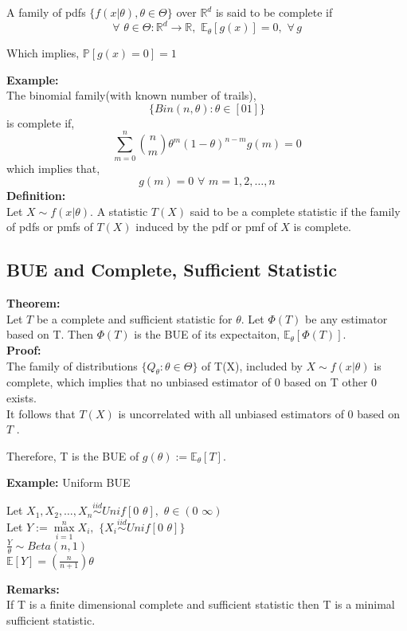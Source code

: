 \documentclass[12pt,a4paper]{article}
\begin{document}
A family of pdfs $\{f(x|\theta),\theta \in \Theta \}$ over $\mathbb{R}^d$ is said to be complete if
$$\forall\,\, \theta\in \Theta : \mathbb{R}^d\rightarrow \mathbb{R}, \,\, \mathbb{E}_\theta[g(x)]=0, \,\, \forall\, g$$
\begin{center}
Which implies,  $\mathbb{P}[g(x)=0]=1$ 
\end{center} 
\textbf{Example:}\\
The binomial family(with known number of trails),
$$\{Bin(n,\theta): \theta\in[0 1]\}$$ is complete if, $$\sum \limits_{m=0}^n {n \choose m}\theta^m(1-\theta)^{n-m} g(m)=0 $$
which implies that, $$g(m)=0\,\, \forall \,\, m=1,2,\dots,n$$
\textbf{Definition:}\\
Let $X \sim f(x|\theta)$. A statistic $T(X)$ said to be a complete statistic if the family of pdfs or pmfs of $T(X)$ induced by the pdf or pmf of $X$ is complete. \\
\subsection{BUE and Complete, Sufficient Statistic}
\textbf{Theorem:}\\
Let $T$ be a complete and sufficient statistic for $\theta.$ Let $\Phi(T)$ be any estimator based on T. Then $\Phi(T)$ is the BUE of its expectaiton, $\mathbb{E}_\theta[\Phi(T)].$\\
\textbf{Proof:}\\
The family of distributions $ \{ Q_ \theta: \theta \in \Theta \}$ of T(X), included by $X \sim f(x| \theta)$ is complete, which implies that no unbiased estimator of 0 based on T other 0 exists.\\
It follows that $T(X)$ is uncorrelated with all unbiased estimators of 0 based on $T$ .
\begin{center}
Therefore, T is the BUE of $g(\theta):=\mathbb{E}_\theta[T].$ 
\end{center}
\textbf{Example:} Uniform BUE
\begin{center}
Let $X_1,X_2,\dots,X_n \overset{iid}{\sim} Unif[0 \,\,\theta], \,\, \theta\in(0\,\, \infty)$\\
Let $Y:=\max\limits_{i=1}^n X_i, \,\, \{X_i\overset{iid}{\sim}Unif[0\,\,\theta]\} $\\ 
\hfill \break
$\displaystyle{ \frac{Y}{\theta} \sim Beta(n,1)}$\\
\hfill \break
$\mathbb{E}[Y]=(\frac{n}{n+1}) \theta $
\end{center}
\textbf{Remarks:}\\
If T is a finite dimensional complete and sufficient statistic then T is a minimal sufficient statistic. 
\end{document}
